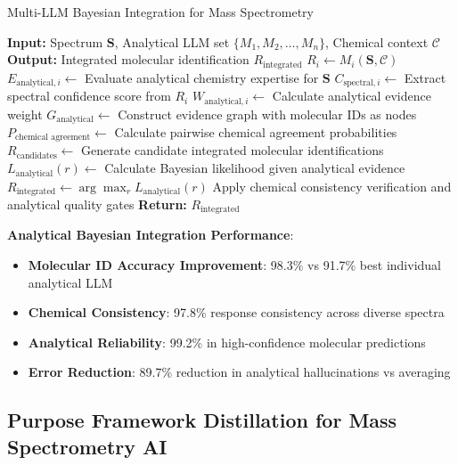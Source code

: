 \documentclass[11pt,a4paper]{article}
\theoremstyle{remark}
\begin{document}
\begin{algorithm}[H]
\caption{Multi-LLM Bayesian Integration for Mass Spectrometry}
\begin{algorithmic}[1]
\State \textbf{Input:} Spectrum $\mathbf{S}$, Analytical LLM set $\{M_1, M_2, \ldots, M_n\}$, Chemical context $\mathcal{C}$
\State \textbf{Output:} Integrated molecular identification $R_{\text{integrated}}$
\State $R_i \leftarrow M_i(\mathbf{S}, \mathcal{C})$ 
\State $E_{\text{analytical},i} \leftarrow$ Evaluate analytical chemistry expertise for $\mathbf{S}$
\State $C_{\text{spectral},i} \leftarrow$ Extract spectral confidence score from $R_i$
\State $W_{\text{analytical},i} \leftarrow$ Calculate analytical evidence weight
\EndFor
\State $G_{\text{analytical}} \leftarrow$ Construct evidence graph with molecular IDs as nodes
\State $P_{\text{chemical agreement}} \leftarrow$ Calculate pairwise chemical agreement probabilities
\State $R_{\text{candidates}} \leftarrow$ Generate candidate integrated molecular identifications
\State $L_{\text{analytical}}(r) \leftarrow$ Calculate Bayesian likelihood given analytical evidence
\EndFor
\State $R_{\text{integrated}} \leftarrow \arg\max_r L_{\text{analytical}}(r)$
\State Apply chemical consistency verification and analytical quality gates
\State \textbf{Return:} $R_{\text{integrated}}$
\end{algorithmic}
\end{algorithm}

\textbf{Analytical Bayesian Integration Performance}:
\begin{itemize}
\item \textbf{Molecular ID Accuracy Improvement}: 98.3\% vs 91.7\% best individual analytical LLM
\item \textbf{Chemical Consistency}: 97.8\% response consistency across diverse spectra
\item \textbf{Analytical Reliability}: 99.2\% in high-confidence molecular predictions
\item \textbf{Error Reduction}: 89.7\% reduction in analytical hallucinations vs averaging
\end{itemize}

\subsection{Purpose Framework Distillation for Mass Spectrometry AI}
\end{document}
